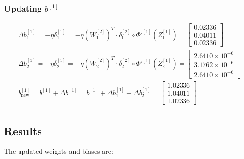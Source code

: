 \documentclass{article}
\begin{document}
\subsubsection*{Updating $b^{[1]}$}

\begin{align*}
    &\Delta b^{[1]}_1 = - \eta \delta^{[1]}_1 = - \eta (W^{[2]}_1)^T \cdot \delta^{[2]}_1 \circ \Phi'^{[1]}(Z^{[1]}_1) = \begin{bmatrix} 0.02336 \\  0.04011 \\  0.02336\end{bmatrix} \\
    &\Delta b^{[1]}_2 = - \eta \delta^{[1]}_2 = - \eta (W^{[2]}_2)^T \cdot \delta^{[2]}_2 \circ \Phi'^{[1]}(Z^{[1]}_2) = \begin{bmatrix} 2.6410\times 10^{-6} \\  3.1762\times 10^{-6} \\  2.6410\times 10^{-6}\end{bmatrix} \\
    &b^{[1]}_{\text{new}} = b^{[1]} + \Delta b^{[1]} = b^{[1]} + \Delta b^{[1]}_1 + \Delta b^{[1]}_2 = \begin{bmatrix} 1.02336 \\  1.04011 \\  1.02336\end{bmatrix} \\
\end{align*}

\subsection*{Results}

The updated weights and biases are:
\end{document}
